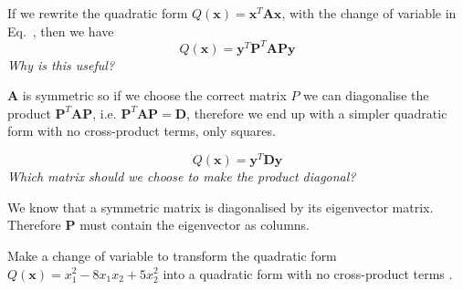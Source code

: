 \documentclass[a4paper]{article}
\numberwithin{equation}{section} %
\renewcommand{\eqref}{Eq.~\originaleqref}
\renewcommand*{\eqref}[1]{Eq.~\originaleqref{#1}}
\begin{document}
If we rewrite the quadratic form $Q(\textbf{x})=\textbf{x}^{T}\textbf{Ax}$, with the change of variable in \eqref{eq:3}, then we have
\begin{equation}
	Q(\textbf{x})=\textbf{y}^{T}\textbf{P}^{T}\textbf{APy}
\end{equation}
\faQuestionCircle \textit{ Why is this useful?}
\begin{addmargin}[2em]{0em}%
  \textbf{A} is symmetric so if we choose the correct matrix $P$ we can diagonalise the product $\textbf{P}^{T}\textbf{AP}$, i.e. $\textbf{P}^{T}\textbf{AP}=\textbf{D}$, therefore we end up with a simpler quadratic form with no cross-product terms, only squares.
\end{addmargin}
\begin{equation}
	Q(\textbf{x})=\textbf{y}^{T}\textbf{D}\textbf{y}
\end{equation}
\faQuestionCircle \textit{ Which matrix should we choose to make the product diagonal?}
\begin{addmargin}[2em]{0em}%
  We know that a symmetric matrix is diagonalised by its eigenvector matrix. Therefore $\textbf{P}$ must contain the eigenvector as columns.
\end{addmargin}
\begin{exmp}
  Make a change of variable to transform the quadratic form $Q(\textbf{x})=x_{1}^{2}-8x_{1}x_{2}+5x_{2}^{2}$ into a quadratic form with no cross-product terms \cite{lay}.
\end{exmp}
\end{document}
